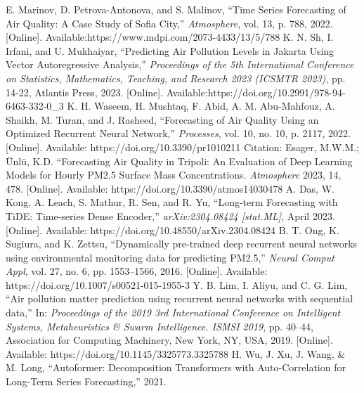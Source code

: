\documentclass[conference]{IEEEtran}
\begin{document}
\begin{thebibliography}{00}
    E. Marinov, D. Petrova-Antonova, and S. Malinov,
    ``Time Series Forecasting of Air Quality: A Case Study of Sofia City,''
    \textit{Atmosphere}, vol. 13, p. 788, 2022. [Online]. Available:https://www.mdpi.com/2073-4433/13/5/788
     K. N. Sh, I. Irfani, and U. Mukhaiyar,
    ``Predicting Air Pollution Levels in Jakarta Using Vector Autoregressive Analysis,''
    \textit{Proceedings of the 5th International Conference on Statistics, Mathematics, Teaching, and Research 2023 (ICSMTR 2023)}, pp. 14-22, Atlantis Press, 2023. [Online].
    Available:https://doi.org/10.2991/978-94-6463-332-0\string_3
    K. H. Waseem, H. Mushtaq, F. Abid, A. M. Abu-Mahfouz, A. Shaikh, M. Turan, and J. Rasheed,
    ``Forecasting of Air Quality Using an Optimized Recurrent Neural Network,''
    \textit{Processes}, vol. 10, no. 10, p. 2117, 2022. [Online].
    Available: https://doi.org/10.3390/pr1010211
    Citation: Esager, M.W.M.; Ünlü, K.D.
    ``Forecasting Air Quality in Tripoli: An Evaluation of Deep Learning Models for Hourly PM2.5 Surface Mass Concentrations.
    \textit {Atmosphere} 2023, 14, 478. [Online].
    Available: https://doi.org/10.3390/atmos14030478
    A. Das, W. Kong, A. Leach, S. Mathur, R. Sen, and R. Yu,
    ``Long-term Forecasting with TiDE: Time-series Dense Encoder,''
    \textit{arXiv:2304.08424 [stat.ML]}, April 2023.
    [Online]. Available: https://doi.org/10.48550/arXiv.2304.08424
    B. T. Ong, K. Sugiura, and K. Zettsu,
    ``Dynamically pre-trained deep recurrent neural networks using environmental monitoring data for predicting PM2.5,''
    \textit{Neural Comput Appl}, vol. 27, no. 6, pp. 1553–1566, 2016.
    [Online]. Available: https://doi.org/10.1007/s00521-015-1955-3
    Y. B. Lim, I. Aliyu, and C. G. Lim,
    ``Air pollution matter prediction using recurrent neural networks with sequential data,''
    In: \textit{Proceedings of the 2019 3rd International Conference on Intelligent Systems, Metaheuristics \& Swarm Intelligence. ISMSI 2019}, pp. 40–44, Association for Computing Machinery, New York, NY, USA, 2019.
    [Online]. Available: https://doi.org/10.1145/3325773.3325788
    H. Wu, J. Xu, J. Wang, \& M. Long,
    ``Autoformer: Decomposition Transformers with Auto-Correlation for Long-Term Series Forecasting,''
    2021.
    
    \end{thebibliography}
    \vspace{12pt}
    
    
\end{document}
